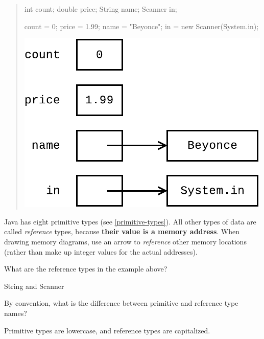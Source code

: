 
\begin{quote}
\begin{multicols}{2}

\begin{javalst}
int count;
double price;
String name;
Scanner in;

count = 0;
price = 1.99;
name = "Beyonce";
in = new Scanner(System.in);
\end{javalst}

\includegraphics[width=\linewidth]{reference1.pdf}

\end{multicols}
\end{quote}

Java has eight primitive types (see \ref{primitive-types}).
All other types of data are called \emph{reference} types, because \textbf{their value is a memory address}.
When drawing memory diagrams, use an arrow to \emph{reference} other memory locations (rather than make up integer values for the actual addresses).




\Q What are the reference types in the example above?

\begin{answer}
String and Scanner
\end{answer}


\Q By convention, what is the difference between primitive and reference type names?

\begin{answer}
Primitive types are lowercase, and reference types are capitalized.
\end{answer}


